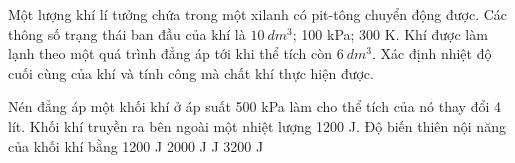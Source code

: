 \begin{vidu}%
	Một lượng khí lí tưởng chứa trong một xilanh có pit-tông chuyển động được. Các thông số trạng thái ban đầu của khí là $10\ dm^3$; 100 kPa; 300 K. Khí được làm lạnh theo một quá trình đẳng áp tới khi thể tích còn $6\ dm^3$. Xác định nhiệt độ cuối cùng của khí và tính công mà chất khí thực hiện được.
\end{vidu}

\begin{vidu}%
	Nén đẳng áp một khối khí ở áp suất 500 kPa làm cho thể tích của nó thay đổi 4 lít. Khối khí truyền ra bên ngoài một nhiệt lượng 1200 J. Độ biến thiên nội năng của khối khí bằng
	\choice
	{1200 J}
	{2000 J}
	{ J}
	{3200 J}
\end{vidu}

